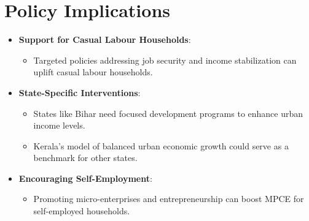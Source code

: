 \documentclass{article}
\begin{document}
\section*{Policy Implications}

\begin{itemize}
	\item \textbf{Support for Casual Labour Households}:
	\begin{itemize}
		\item Targeted policies addressing job security and income stabilization can uplift casual labour households.
	\end{itemize}
	\item \textbf{State-Specific Interventions}:
	\begin{itemize}
		\item States like Bihar need focused development programs to enhance urban income levels.
		\item Kerala's model of balanced urban economic growth could serve as a benchmark for other states.
	\end{itemize}
	\item \textbf{Encouraging Self-Employment}:
	\begin{itemize}
		\item Promoting micro-enterprises and entrepreneurship can boost MPCE for self-employed households.
	\end{itemize}
\end{itemize}





\newpage
\end{document}
